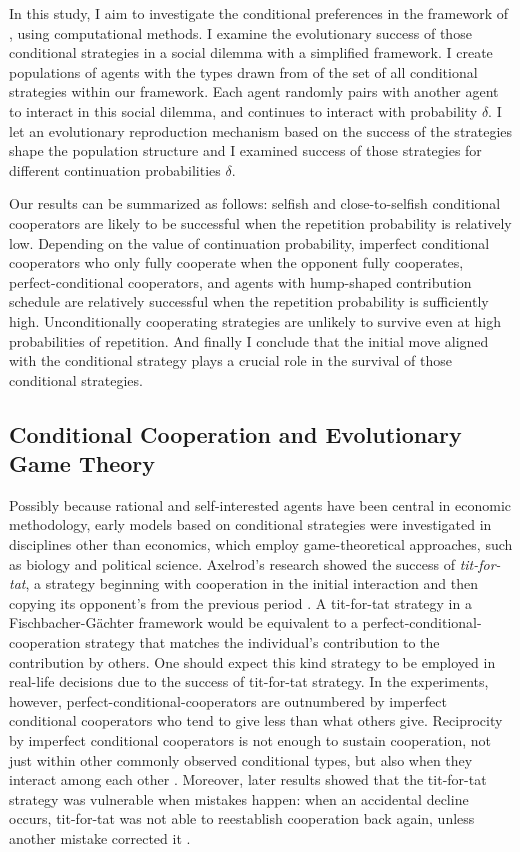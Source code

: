 \documentclass[12pt]{article}
\begin{document}
In this study, I aim to investigate the conditional preferences in the framework of \citet{Fischbacher2001}, using computational methods. I examine the evolutionary success of those conditional strategies in a social dilemma with a simplified framework.  I create populations of agents with the types drawn from of the set of all conditional strategies within our framework. Each agent randomly pairs with another agent to interact in this social dilemma, and continues to interact with probability $\delta$. I let an evolutionary reproduction mechanism based on the success of the strategies shape the population structure and I examined success of those strategies for different continuation probabilities $\delta$. 

Our results can be summarized as follows: selfish and close-to-selfish conditional cooperators are likely to be successful when the repetition probability is relatively low. Depending on the value of continuation probability, imperfect conditional cooperators who only fully cooperate when the opponent fully cooperates, perfect-conditional cooperators, and agents with hump-shaped contribution schedule are relatively successful when the repetition probability is sufficiently high. Unconditionally cooperating strategies are unlikely to survive even at high probabilities of repetition. And finally I conclude that the initial move aligned with the conditional strategy plays a crucial role in the survival of those conditional strategies.

\subsection{Conditional Cooperation and Evolutionary Game Theory}

Possibly because rational and self-interested agents have been central in economic methodology, early models based on conditional strategies were investigated in disciplines other than economics, which employ game-theoretical approaches, such as biology and political science. Axelrod's research showed the success of \textit{tit-for-tat}, a strategy beginning with cooperation in the initial interaction and then copying its opponent's from the previous period \citep{Axelrod1980a, Axelrod1980b, Axelrod1981-ot}.  A tit-for-tat strategy in a Fischbacher-G{\"a}chter framework would be  equivalent to a perfect-conditional-cooperation strategy that matches the individual's contribution to the contribution by others. One should expect this kind strategy to be employed in real-life decisions due to the success of tit-for-tat strategy. In the experiments, however, perfect-conditional-cooperators are outnumbered by imperfect conditional cooperators who tend to give less than what others give. Reciprocity by imperfect conditional cooperators is not enough to sustain cooperation, not just within other commonly observed conditional types, but also when they interact among each other \citep{Fischbacher2010}.  Moreover, later results showed that the tit-for-tat strategy was vulnerable when mistakes happen: when an accidental decline occurs, tit-for-tat was not able to reestablish cooperation back again, unless another mistake corrected it \citep{Hirshleifer1988-fh, Selten1984-sb, Fundenberg1990-up, Nowak1993-gl}.
\end{document}
